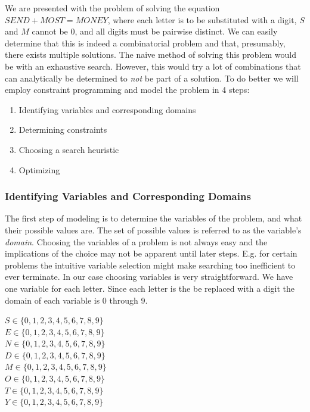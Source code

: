 We are presented with the problem of solving the equation $SEND + MOST = MONEY$, where
each letter is to be substituted with a digit, $S$ and $M$ cannot be 0, and all digits must
be pairwise distinct. We can easily determine that this is indeed a combinatorial problem
and that, presumably, there exists multiple solutions. The naive method of solving this
problem would be with an exhaustive search. However, this would try a lot of combinations
that can analytically be determined to \textit{not} be part of a solution. To do better we
will employ constraint programming and model the problem in 4 steps:

\begin{enumerate}
	\item Identifying variables and corresponding domains
	\item Determining constraints
	\item Choosing a search heuristic
	\item Optimizing
\end{enumerate}

\subsubsection{Identifying Variables and Corresponding Domains}

The first step of modeling is to determine the variables of the problem, and what their
possible values are. The set of possible values is referred to as the variable's \textit{
domain}. Choosing the variables of a problem is not always easy and the implications
of the choice may not be apparent until later steps. E.g. for certain problems the intuitive
variable selection might make searching too inefficient to ever terminate. In our case
choosing variables is very straightforward. We have one variable for each letter. Since
each letter is the be replaced with a digit the domain of each variable is 0 through 9.

\vspace{0.5cm}
\noindent
$S \in \{0, 1, 2, 3, 4, 5, 6, 7, 8, 9\}$ \\
$E \in \{0, 1, 2, 3, 4, 5, 6, 7, 8, 9\}$ \\
$N \in \{0, 1, 2, 3, 4, 5, 6, 7, 8, 9\}$ \\
$D \in \{0, 1, 2, 3, 4, 5, 6, 7, 8, 9\}$ \\
$M \in \{0, 1, 2, 3, 4, 5, 6, 7, 8, 9\}$ \\
$O \in \{0, 1, 2, 3, 4, 5, 6, 7, 8, 9\}$ \\
$T \in \{0, 1, 2, 3, 4, 5, 6, 7, 8, 9\}$ \\
$Y \in \{0, 1, 2, 3, 4, 5, 6, 7, 8, 9\}$

